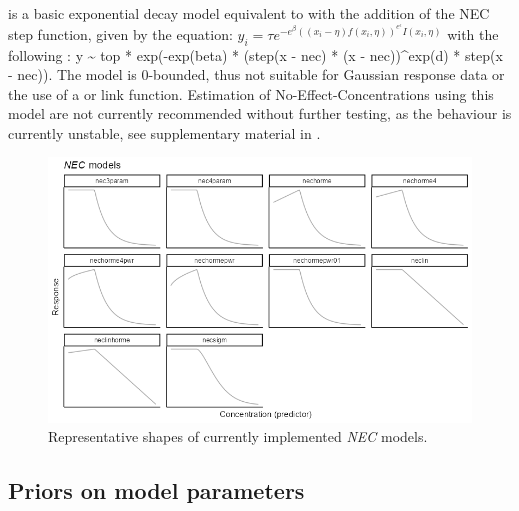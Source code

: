 \documentclass[
  shortnames]{jss}
\begin{document}
 is a basic exponential decay model equivalent to  with the addition of the NEC step function, given by the equation:
\(y_i = \tau e^{-e^{\beta} ((x_i - \eta) f(x_i, \eta))^{e^\epsilon}I(x_i, \eta)}\)
with the following : y \textasciitilde{} top * exp(-exp(beta) * (step(x - nec) * (x - nec))\^{}exp(d) * step(x - nec)). The model is 0-bounded, thus not suitable for Gaussian response data or the use of a  or  link function. Estimation of No-Effect-Concentrations using this model are not currently recommended without further testing, as the behaviour is currently unstable, see supplementary material in \citet{fisher2023ieam}.

\begin{figure}[ht]
  \centering
  \includegraphics[width=1\textwidth]{../vignettes/vignette-fig-exmp2b-theoretical_nec_curves.png}
  \caption{Representative shapes of currently implemented  \textit{NEC} models.}
  \label{fig2}
\end{figure}

\hypertarget{priors-on-model-parameters}{%
\subsection{Priors on model parameters}\label{priors-on-model-parameters}}
\end{document}
